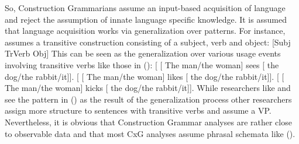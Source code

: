 So, Construction Grammarians assume an input-based acquisition of language and reject the assumption
of innate language specific knowledge. It is assumed that language acquisition works via
generalization over patterns. For instance, \citet{Tomasello2003a} assumes a transitive construction
consisting of a subject, verb and object:
\ea
{}[Subj TrVerb Obj]
\z
This can be seen as the generalization over various usage events involving transitive verbs like
those in ():
\eal
\label{Beispiele-fuer-Transitivkonstruktion}
\ex {}[ [ The man/the woman] sees  [ the dog/the rabbit/it]].
\ex {}[ [ The man/the woman] likes [ the dog/the rabbit/it]].
\ex {}[ [ The man/the woman] kicks [ the dog/the rabbit/it]].
\zl
While researchers like \citet{Croft2001a} and \citet{Tomasello2003a} see the pattern in () as the result of the
generalization process other researchers assign more structure to sentences with transitive verbs
and assume a VP. Nevertheless, it is obvious that Construction Grammar analyses are rather close to
observable data and that most CxG analyses assume phrasal schemata like (). 

